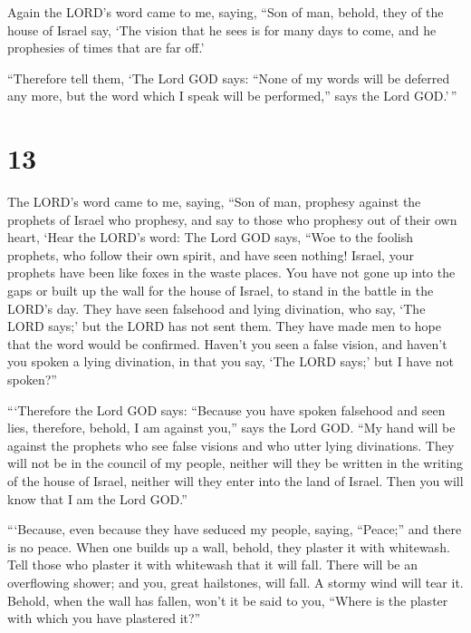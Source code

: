  Again the LORD's word came to me, saying, 
``Son of man, behold, they of the house of Israel say, `The vision that
he sees is for many days to come, and he prophesies of times that are
far off.'

 ``Therefore tell them, `The Lord GOD says: ``None of my
words will be deferred any more, but the word which I speak will be
performed,'' says the Lord GOD.'\,''

\hypertarget{section-11}{%
\section{13}\label{section-11}}

 The LORD's word came to me, saying,  ``Son of
man, prophesy against the prophets of Israel who prophesy, and say to
those who prophesy out of their own heart, `Hear the LORD's word:
 The Lord GOD says, ``Woe to the foolish prophets, who
follow their own spirit, and have seen nothing!  Israel,
your prophets have been like foxes in the waste places.  You
have not gone up into the gaps or built up the wall for the house of
Israel, to stand in the battle in the LORD's day.  They have
seen falsehood and lying divination, who say, `The LORD says;' but the
LORD has not sent them. They have made men to hope that the word would
be confirmed.  Haven't you seen a false vision, and haven't
you spoken a lying divination, in that you say, `The LORD says;' but I
have not spoken?''

 ```Therefore the Lord GOD says: ``Because you have spoken
falsehood and seen lies, therefore, behold, I am against you,'' says the
Lord GOD.  ``My hand will be against the prophets who see
false visions and who utter lying divinations. They will not be in the
council of my people, neither will they be written in the writing of the
house of Israel, neither will they enter into the land of Israel. Then
you will know that I am the Lord GOD.''

 ```Because, even because they have seduced my people,
saying, ``Peace;'' and there is no peace. When one builds up a wall,
behold, they plaster it with whitewash.  Tell those who
plaster it with whitewash that it will fall. There will be an
overflowing shower; and you, great hailstones, will fall. A stormy wind
will tear it.  Behold, when the wall has fallen, won't it
be said to you, ``Where is the plaster with which you have plastered
it?''

